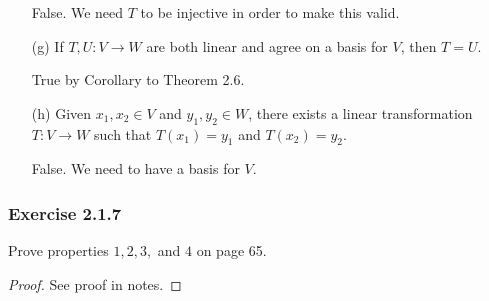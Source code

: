 \begin{enumerate}
\begin{solution}
            False. We need \( T  \) to be injective in order to make this valid.
        \end{solution} 
    \item[(g)] If \( T,U  : V \to W  \) are both linear and agree on a basis for \( V  \), then \( T = U  \).
        \begin{solution}
            True by Corollary to Theorem 2.6.
        \end{solution}
    \item[(h)] Given \( x_{1}, x_{2} \in V  \) and \( y_{1}, y_{2} \in W  \), there exists a linear transformation \( T: V \to W  \) such that \( T(x_{1}) =y_{1}  \) and \( T(x_{2}) =y_{2} \). 
        \begin{solution}
           False. We need to have a basis for \( V  \). 
        \end{solution}
\end{enumerate}

\subsubsection{Exercise 2.1.7} Prove properties \( 1,2,3, \) and \( 4 \) on page 65.
\begin{proof}
See proof in notes.
\end{proof}

